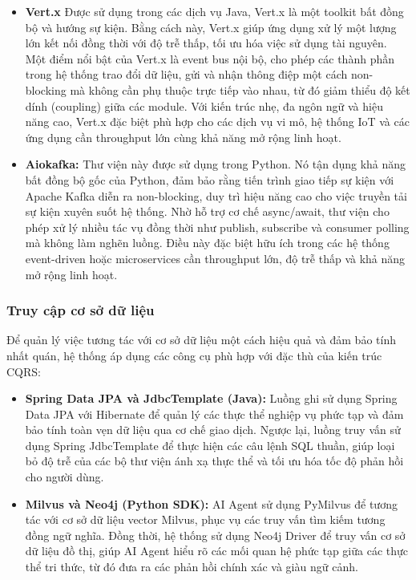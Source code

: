 \begin{itemize}
    \item \textbf{Vert.x\: }Được sử dụng trong các dịch vụ Java, Vert.x là một toolkit bất đồng bộ và hướng sự kiện. Bằng cách này, Vert.x giúp ứng dụng xử lý một lượng lớn kết nối đồng thời với độ trễ thấp, tối ưu hóa việc sử dụng tài nguyên. Một điểm nổi bật của Vert.x là event bus nội bộ, cho phép các thành phần trong hệ thống trao đổi dữ liệu, gửi và nhận thông điệp một cách non-blocking mà không cần phụ thuộc trực tiếp vào nhau\cite{vertx_core}, từ đó giảm thiểu độ kết dính (coupling) giữa các module. Với kiến trúc nhẹ, đa ngôn ngữ và hiệu năng cao, Vert.x đặc biệt phù hợp cho các dịch vụ vi mô\cite{vertx_microservices}, hệ thống IoT và các ứng dụng cần throughput lớn cùng khả năng mở rộng linh hoạt.
    \item \textbf{Aiokafka: }Thư viện này được sử dụng trong Python. Nó tận dụng khả năng bất đồng bộ gốc của Python, đảm bảo rằng tiến trình giao tiếp sự kiện với Apache Kafka diễn ra non-blocking, duy trì hiệu năng cao cho việc truyền tải sự kiện xuyên suốt hệ thống\cite{aiokafka_perf}. Nhờ hỗ trợ cơ chế async/await, thư viện cho phép xử lý nhiều tác vụ đồng thời như publish, subscribe và consumer polling mà không làm nghẽn luồng\cite{aiokafka_perf}. Điều này đặc biệt hữu ích trong các hệ thống event-driven hoặc microservices cần throughput lớn, độ trễ thấp và khả năng mở rộng linh hoạt.
\end{itemize}

\subsubsection{Truy cập cơ sở dữ liệu}

Để quản lý việc tương tác với cơ sở dữ liệu một cách hiệu quả và đảm bảo tính nhất quán, hệ thống áp dụng các công cụ phù hợp với đặc thù của kiến trúc CQRS:

\begin{itemize}
    \item \textbf{Spring Data JPA và JdbcTemplate (Java):} Luồng ghi sử dụng Spring Data JPA với Hibernate để quản lý các thực thể nghiệp vụ phức tạp và đảm bảo tính toàn vẹn dữ liệu qua cơ chế giao dịch. Ngược lại, luồng truy vấn sử dụng Spring JdbcTemplate để thực hiện các câu lệnh SQL thuần, giúp loại bỏ độ trễ của các bộ thư viện ánh xạ thực thể và tối ưu hóa tốc độ phản hồi cho người dùng.
    \item \textbf{Milvus và Neo4j (Python SDK):} AI Agent sử dụng PyMilvus để tương tác với cơ sở dữ liệu vector Milvus, phục vụ các truy vấn tìm kiếm tương đồng ngữ nghĩa. Đồng thời, hệ thống sử dụng Neo4j Driver để truy vấn cơ sở dữ liệu đồ thị, giúp AI Agent hiểu rõ các mối quan hệ phức tạp giữa các thực thể tri thức, từ đó đưa ra các phản hồi chính xác và giàu ngữ cảnh.
\end{itemize}

